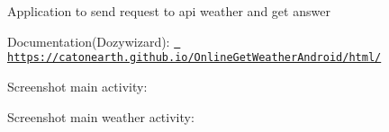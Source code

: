 Application to send request to api weather and get answer 

Documentation(\+Dozywizard)\+: \href{https://catonearth.github.io/OnlineGetWeatherAndroid/html/}{\texttt{ https\+://catonearth.\+github.\+io/\+Online\+Get\+Weather\+Android/html/}}

Screenshot main activity\+: ~\newline
 

 

Screenshot main weather activity\+: ~\newline
 

 